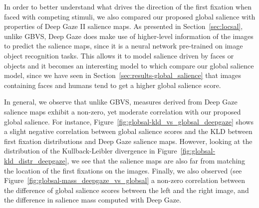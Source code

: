 {In order to better understand what drives the direction of the first fixation when faced with competing stimuli, we also compared our proposed global salience with properties of Deep Gaze II salience maps. As presented in Section~\ref{sec:locsal}, unlike GBVS, Deep Gaze does make use of higher-level information of the images to predict the salience maps, since it is a neural network pre-trained on image object recognition tasks. This allows it to model salience driven by faces or objects \citep{kuemmerer2017icfdeepgaze} and it becomes an interesting model to which compare our global salience model, since we have seen in Section~\ref{sec:results-global_salience} that images containing faces and humans tend to get a higher global salience score.

In general, we observe that unlike GBVS, measures derived from Deep Gaze salience maps exhibit a non-zero, yet moderate correlation with our proposed global salience. For instance, Figure~\ref{fig:globsal-kld_vs_globsal_deepgaze} shows a slight negative correlation between global salience scores and the KLD between first fixation distributions and Deep Gaze salience maps. However, looking at the distribution of the Kullback-Leibler divergence in Figure~\ref{fig:globsal-kld_distr_deepgaze}, we see that the salience maps are also far from matching the location of the first fixations on the images. Finally, we also observed (see Figure~\ref{fig:globsal-mass_deepgaze_vs_globsal} a non-zero correlation between the difference of global salience scores between the left and the right image, and the difference in salience mass computed with Deep Gaze.

}
